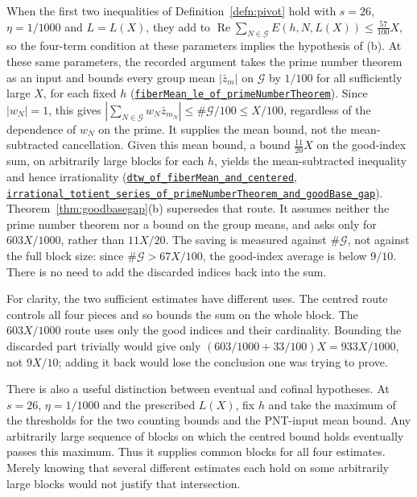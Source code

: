 \documentclass[11pt]{article}
\theoremstyle{plain}
\theoremstyle{definition}
\theoremstyle{remark}
\begin{document}
When the first two inequalities of Definition~\ref{defn:pivot} hold with
$s=26$, $\eta=1/1000$ and $L=L(X)$, they add to
$\operatorname{Re}\sum_{N\in\mathcal G}E(h,N,L(X))\le\tfrac{57}{100}X$, so
the four-term condition at these parameters implies the hypothesis of (b).
At these same parameters, the recorded argument takes the prime number
theorem as an input and bounds every group mean $|\bar z_m|$ on
$\mathcal G$ by $1/100$ for all sufficiently large $X$, for each fixed $h$
(\href{https://github.com/wcook04/plectis-erdos/blob/24edbddbe2bd68e920327a701aad0b9dd0d69675/lean/ErdosProblems/Erdos249/PaperCompleteR21/FiberMeanOfPrimeNumberTheorem.lean\#L935}{\texttt{fiberMean\_le\_of\_primeNumberTheorem}}).
Since $|w_N|=1$, this gives
$|\sum_{N\in\mathcal G}w_N\bar z_{m_N}|\le\#\mathcal G/100\le X/100$,
regardless of the dependence of $w_N$ on the prime. It supplies the mean
bound, not the mean-subtracted cancellation. Given this mean bound,
a bound $\tfrac{11}{20}X$ on the good-index sum, on arbitrarily large
blocks for each $h$, yields the mean-subtracted inequality and hence irrationality
(\href{https://github.com/wcook04/plectis-erdos/blob/24edbddbe2bd68e920327a701aad0b9dd0d69675/lean/ErdosProblems/ArgumentGraph/Results/Erdos249.lean\#L45}{\texttt{dtw\_of\_fiberMean\_and\_centered}},
\href{https://github.com/wcook04/plectis-erdos/blob/24edbddbe2bd68e920327a701aad0b9dd0d69675/lean/ErdosProblems/ArgumentGraph/Results/Erdos249Route.lean\#L118}{\texttt{irrational\_totient\_series\_of\_primeNumberTheorem\_and\_goodBase\_gap}}).
Theorem~\ref{thm:goodbasegap}(b) supersedes that route. It assumes
neither the prime number theorem nor a bound on the group means, and
asks only for $603X/1000$, rather than $11X/20$. The saving is measured
against $\#\mathcal G$, not against the full block size: since
$\#\mathcal G>67X/100$, the good-index average is below $9/10$.
There is no need to add the discarded indices back into the sum.

For clarity, the two sufficient estimates have different uses. The
centred route controls all four pieces and so bounds the sum on the
whole block. The $603X/1000$ route uses only the good indices and their
cardinality. Bounding the discarded part trivially would give only
$(603/1000+33/100)X=933X/1000$, not $9X/10$; adding it back would
lose the conclusion one was trying to prove.

There is also a useful distinction between eventual and cofinal
hypotheses. At $s=26$, $\eta=1/1000$ and the prescribed $L(X)$, fix
$h$ and take the maximum of the thresholds for the two counting bounds
and the PNT-input mean bound. Any arbitrarily large sequence of blocks
on which the centred bound holds eventually passes this maximum.
Thus it supplies common blocks for all four estimates. Merely knowing
that several different estimates each hold on some arbitrarily large
blocks would not justify that intersection.
\end{document}

